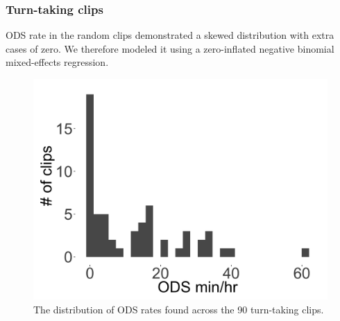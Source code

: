 \documentclass[floatsintext,man]{apa6}
\theoremstyle{definition}
\theoremstyle{definition}
\theoremstyle{definition}
\theoremstyle{remark}
\begin{document}
\FloatBarrier

\subsubsection{Turn-taking clips}\label{models-ods-turntaking}

ODS rate in the random clips demonstrated a skewed distribution with
extra cases of zero. We therefore modeled it using a zero-inflated
negative binomial mixed-effects regression.

\FloatBarrier

\begin{figure}[H]

{\centering \includegraphics[width=0.4\linewidth]{www/ODS_turntaking_distribution} 

}

\caption{The distribution of ODS rates found across the 90 turn-taking clips.}\label{fig:fig10}
\end{figure}

\FloatBarrier
\end{document}
